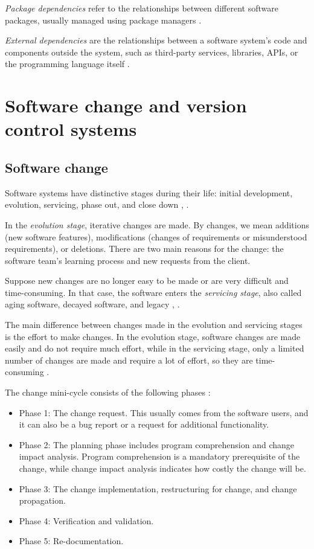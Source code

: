 \textit{Package dependencies} refer to the relationships between different software packages, usually managed using package managers \cite{dep-package}.

\textit{External dependencies} are the relationships between a software system's code and components outside the system, such as third-party services, libraries, APIs, or the programming language itself \cite{dep-external}.




\section{Software change and version control systems}

\subsection{Software change}
\label{change}

\hspace{4em}Software systems have distinctive stages during their life: initial development, evolution, servicing, phase out, and close down \cite{Software-life-cycle}, \cite{model-bennett}.

In the \textit{evolution stage}, iterative changes are made. By changes, we mean additions (new software features), modifications (changes of requirements or misunderstood requirements), or deletions. There are two main reasons for the change: the software team's learning process and new requests from the client.

Suppose new changes are no longer easy to be made or are very difficult and time-consuming. In that case, the software enters the \textit{servicing stage}, also called aging software, decayed software, and legacy \cite{Software-life-cycle}, \cite{363157}.

The main difference between changes made in the evolution and servicing stages is the effort to make changes. In the evolution stage, software changes are made easily and do not require much effort, while in the servicing stage, only a limited number of changes are made and require a lot of effort, so they are time-consuming \cite{Bennett, Rajlich, FoSEReverseEngineering}.

The change mini-cycle consists of the following phases \cite{810308}:
\begin{itemize}
\item Phase 1: The change request. This usually comes from the software users, and it can also be a bug report or a request for additional functionality.
\item Phase 2: The planning phase includes program comprehension and change impact analysis. Program comprehension is a mandatory prerequisite of the change, while change
impact analysis indicates how costly the change will be. \cite{Bohner}
\item Phase 3: The change implementation, restructuring for change, and change propagation.
\item Phase 4: Verification and validation.
\item Phase 5: Re-documentation.
\end{itemize}

